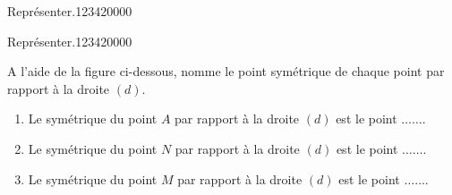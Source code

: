 \begin{pageAD}
\begin{ExoCad}{Représenter.}{1234}{2}{0}{0}{0}{0}
\end{ExoCad}
\begin{ExoCad}{Représenter.}{1234}{2}{0}{0}{0}{0}

 
\begin{minipage}{0.58\linewidth}

A l'aide de la figure ci-dessous, nomme le point symétrique de chaque point par rapport à la droite $(d)$.
 
\begin{enumerate}
\item Le symétrique du point $A$ par rapport à la droite $(d)$ est le point $\ldots\ldots$.\vspace{0.2cm}
\item Le symétrique du point $N$ par rapport à la droite $(d)$ est le point $\ldots\ldots$.\vspace{0.2cm}
\item Le symétrique du point $M$ par rapport à la droite $(d)$ est le point $\ldots\ldots$.
\end{enumerate}

\end{minipage}
\hfill
\begin{minipage}{0.38\linewidth}


\end{minipage}
\end{ExoCad}
\end{pageAD}
